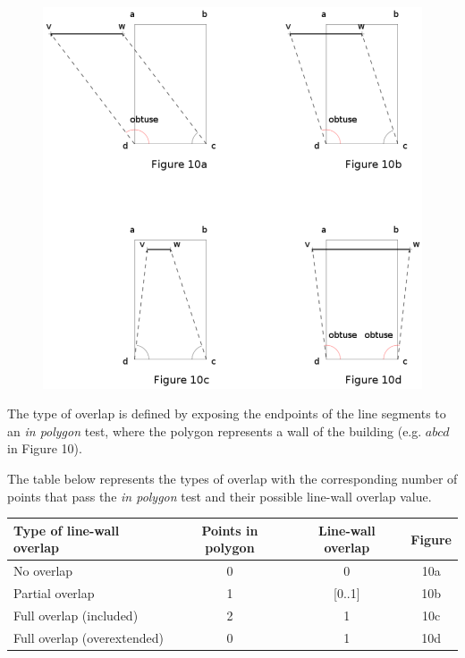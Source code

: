 \documentclass[10pt]{article}
\begin{document}
	\begin{figure}[!ht]
	\centering
	\includegraphics[width=12cm]{img/overlaytypes.png}
	\end{figure}
		


	The type of overlap is defined by exposing the endpoints of the line
	segments to an \emph{in polygon} test, where the polygon represents a 
	wall of the building (e.g. $abcd$ in Figure 10).

	The table below represents the types of overlap with the corresponding number of points
	that pass the \emph{in polygon} test and their possible line-wall overlap
	value.\\ 

	\begin{tabular}{|l||c|c|c|}
	\hline
	Type of line-wall overlap 			&	Points in polygon 			& Line-wall overlap & Figure \\
	\hline
	\hline
	No overlap					&	0					& 0		& 10a\\
	\hline
	Partial overlap 				&	1					& [0..1]	& 10b\\
	\hline
	Full overlap (included)		&	2					& 1		& 10c\\
	\hline
	Full overlap (overextended)		&  	0					& 1 		& 10d\\
	\hline
	\end{tabular}
\end{document}
